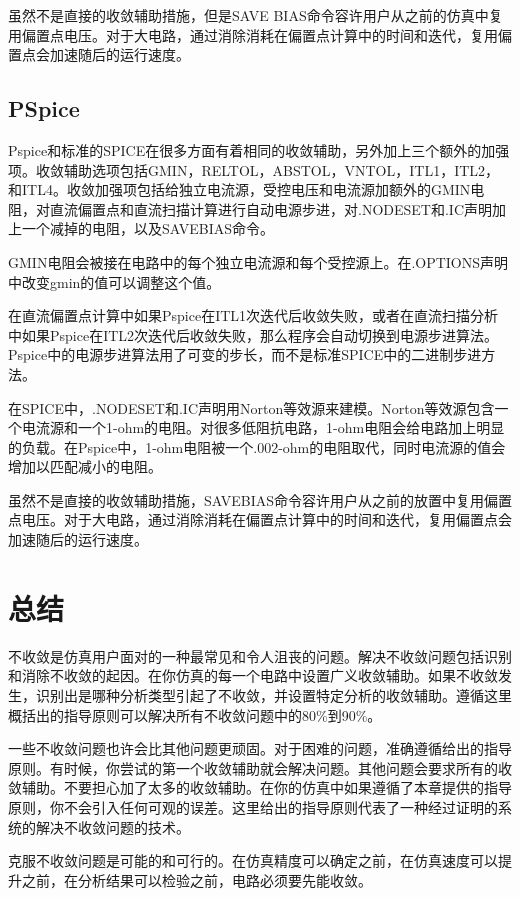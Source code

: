 虽然不是直接的收敛辅助措施，但是SAVE BIAS命令容许用户从之前的仿真中复用偏置点电压。对于大电路，通过消除消耗在偏置点计算中的时间和迭代，复用偏置点会加速随后的运行速度。

\subsection{PSpice}
Pspice和标准的SPICE在很多方面有着相同的收敛辅助，另外加上三个额外的加强项。收敛辅助选项包括GMIN，RELTOL，ABSTOL，VNTOL，ITL1，ITL2，和ITL4。收敛加强项包括给独立电流源，受控电压和电流源加额外的GMIN电阻，对直流偏置点和直流扫描计算进行自动电源步进，对.NODESET和.IC声明加上一个减掉的电阻，以及SAVEBIAS命令。

GMIN电阻会被接在电路中的每个独立电流源和每个受控源上。在.OPTIONS声明中改变gmin的值可以调整这个值。

在直流偏置点计算中如果Pspice在ITL1次迭代后收敛失败，或者在直流扫描分析中如果Pspice在ITL2次迭代后收敛失败，那么程序会自动切换到电源步进算法。Pspice中的电源步进算法用了可变的步长，而不是标准SPICE中的二进制步进方法。

在SPICE中，.NODESET和.IC声明用Norton等效源来建模。Norton等效源包含一个电流源和一个1-ohm的电阻。对很多低阻抗电路，1-ohm电阻会给电路加上明显的负载。在Pspice中，1-ohm电阻被一个.002-ohm的电阻取代，同时电流源的值会增加以匹配减小的电阻。

虽然不是直接的收敛辅助措施，SAVEBIAS命令容许用户从之前的放置中复用偏置点电压。对于大电路，通过消除消耗在偏置点计算中的时间和迭代，复用偏置点会加速随后的运行速度。

\section{总结}
不收敛是仿真用户面对的一种最常见和令人沮丧的问题。解决不收敛问题包括识别和消除不收敛的起因。在你仿真的每一个电路中设置广义收敛辅助。如果不收敛发生，识别出是哪种分析类型引起了不收敛，并设置特定分析的收敛辅助。遵循这里概括出的指导原则可以解决所有不收敛问题中的80\%到90\%。

一些不收敛问题也许会比其他问题更顽固。对于困难的问题，准确遵循给出的指导原则。有时候，你尝试的第一个收敛辅助就会解决问题。其他问题会要求所有的收敛辅助。不要担心加了太多的收敛辅助。在你的仿真中如果遵循了本章提供的指导原则，你不会引入任何可观的误差。这里给出的指导原则代表了一种经过证明的系统的解决不收敛问题的技术。

克服不收敛问题是可能的和可行的。在仿真精度可以确定之前，在仿真速度可以提升之前，在分析结果可以检验之前，电路必须要先能收敛。


